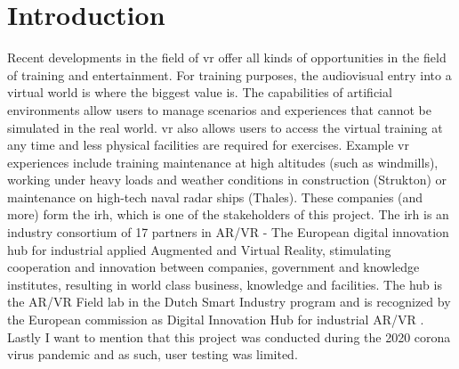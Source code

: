 \section{Introduction}
\label{sec:int}
Recent developments in the field of \acrfull{vr} offer all kinds of opportunities in the field of training
and entertainment. For training purposes, the audiovisual entry into a virtual world is where the biggest value is.
The capabilities of artificial environments allow users to manage scenarios and 
experiences that cannot be simulated in the real world. \acrshort{vr} also allows users to access the virtual training at any time
and less physical facilities are required for exercises. 
Example \acrshort{vr} experiences include training maintenance at high altitudes (such as windmills), working under heavy loads and weather conditions in construction (Strukton) or maintenance on high-tech naval radar ships (Thales). These companies (and more) form the \acrfull{irh}, which is one of the stakeholders of this project. The \acrshort{irh} is an industry consortium of 17 partners in AR/VR - The European digital innovation hub for industrial applied Augmented and Virtual Reality, stimulating cooperation and innovation between companies, government and knowledge institutes, resulting in world class business, knowledge and facilities. The hub is the AR/VR Field lab in the Dutch Smart Industry program and is recognized by the European commission as Digital Innovation Hub for industrial AR/VR \parencite{irh}. Lastly I want to mention that this project was conducted during the 2020 corona virus pandemic and as such, user testing was limited.